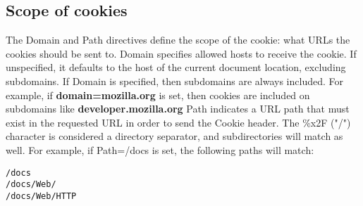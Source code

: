 \subsection{Scope of cookies}
The Domain and Path directives define the scope of the cookie: what URLs the cookies should be sent to.
Domain specifies allowed hosts to receive the cookie. If unspecified, it defaults to the host of the current document location, excluding subdomains. If Domain is specified, then subdomains are always included.
For example, if \textbf{domain=mozilla.org} is set, then cookies are included on subdomains like \textbf{developer.mozilla.org}
Path indicates a URL path that must exist in the requested URL in order to send the Cookie header. The \%x2F ("/") character is considered a directory separator, and subdirectories will match as well.
For example, if Path=/docs is set, the following paths will match:

\begin{lstlisting}[style=verbs]
/docs
/docs/Web/
/docs/Web/HTTP
\end{lstlisting}


